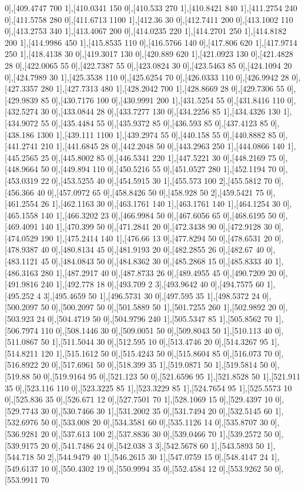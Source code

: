 {0],[409.4747 700 1],[410.0341 150 0],[410.533 270 1],[410.8421 840 1],[411.2754 240 0],[411.5758 280 0],[411.6713 1100 1],[412.36 30 0],[412.7411 200 0],[413.1002 110 0],[413.2753 340 1],[413.4067 200 0],[414.0235 220 1],[414.2701 250 1],[414.8182 200 1],[414.9986 450 1],[415.8535 110 0],[416.5766 140 0],[417.806 620 1],[417.9714 250 1],[418.4138 30 0],[419.3017 130 0],[420.889 620 1],[421.0923 130 0],[421.4828 28 0],[422.0065 55 0],[422.7387 55 0],[423.0824 30 0],[423.5463 85 0],[424.1094 20 0],[424.7989 30 1],[425.3538 110 0],[425.6254 70 0],[426.0333 110 0],[426.9942 28 0],[427.3357 280 1],[427.7313 480 1],[428.2042 700 1],[428.8669 28 0],[429.7306 55 0],[429.9839 85 0],[430.7176 100 0],[430.9991 200 1],[431.5254 55 0],[431.8416 110 0],[432.5274 30 0],[433.0844 28 0],[433.7277 130 0],[434.2256 85 1],[434.4326 130 1],[434.9072 55 0],[435.4484 55 0],[435.9372 85 0],[436.593 85 0],[437.4123 85 0],[438.186 1300 1],[439.111 1100 1],[439.2974 55 0],[440.158 55 0],[440.8882 85 0],[441.2741 210 1],[441.6845 28 0],[442.2048 50 0],[443.2963 250 1],[444.0866 140 1],[445.2565 25 0],[445.8002 85 0],[446.5341 220 1],[447.5221 30 0],[448.2169 75 0],[448.9664 50 0],[449.894 110 0],[450.5216 55 0],[451.0527 280 1],[452.1194 70 0],[453.0319 22 0],[453.5255 40 0],[454.5915 30 1],[455.573 100 2],[455.5812 70 0],[456.366 40 0],[457.0972 65 0],[458.8426 50 0],[458.928 50 2],[459.5421 75 0],[461.2554 26 1],[462.1163 30 0],[463.1761 140 1],[463.1761 140 1],[464.1254 30 0],[465.1558 140 1],[466.3202 23 0],[466.9984 50 0],[467.6056 65 0],[468.6195 50 0],[469.4091 140 1],[470.399 50 0],[471.2841 20 0],[472.3438 90 0],[472.9128 30 0],[474.0529 190 1],[475.2414 140 1],[476.66 13 0],[477.8294 50 0],[478.6531 20 0],[478.9387 40 0],[480.8134 45 0],[481.9193 20 0],[482.2855 26 0],[482.67 40 0],[483.1121 45 0],[484.0843 50 0],[484.8362 30 0],[485.2868 15 0],[485.8333 40 1],[486.3163 280 1],[487.2917 40 0],[487.8733 26 0],[489.4955 45 0],[490.7209 20 0],[491.9816 240 1],[492.778 18 0],[493.709 2 3],[493.9642 40 0],[494.7575 60 1],[495.252 4 3],[495.4659 50 1],[496.5731 30 0],[497.595 35 1],[498.5372 24 0],[500.2097 50 0],[500.2097 50 0],[501.5889 50 1],[501.7255 260 1],[502.9892 20 0],[503.923 24 0],[504.4719 50 0],[504.9796 240 1],[505.5347 85 1],[505.8562 70 1],[506.7974 110 0],[508.1446 30 0],[509.0051 50 0],[509.8043 50 1],[510.113 40 0],[511.0867 50 1],[511.5044 30 0],[512.595 10 0],[513.4746 20 0],[514.3267 95 1],[514.8211 120 1],[515.1612 50 0],[515.4243 50 0],[515.8604 85 0],[516.073 70 0],[516.8922 20 0],[517.6961 50 0],[518.399 35 1],[519.0871 50 1],[519.5814 50 0],[519.88 50 0],[519.9164 95 0],[521.123 50 0],[521.6596 95 1],[521.8528 50 1],[521.911 35 0],[523.116 110 0],[523.3225 85 1],[523.3229 85 1],[524.7654 95 1],[525.5573 10 0],[525.836 35 0],[526.671 12 0],[527.7501 70 1],[528.1069 15 0],[529.4397 10 0],[529.7743 30 0],[530.7466 30 1],[531.2002 35 0],[531.7494 20 0],[532.5145 60 1],[532.6976 50 0],[533.008 20 0],[534.3581 60 0],[535.1126 14 0],[535.8707 30 0],[536.9281 20 0],[537.613 100 2],[537.8836 30 0],[539.0466 70 1],[539.2572 50 0],[539.9175 20 0],[541.7486 24 0],[542.038 3 3],[542.5678 60 1],[543.5893 50 1],[544.718 50 2],[544.9479 40 1],[546.2615 30 1],[547.0759 15 0],[548.4147 24 1],[549.6137 10 0],[550.4302 19 0],[550.9994 35 0],[552.4584 12 0],[553.9262 50 0],[553.9911 70 }
